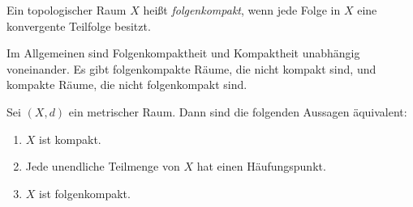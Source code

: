 \begin{definition}
Ein topologischer Raum $X$ heißt \emph{folgenkompakt}, wenn jede Folge in $X$ eine konvergente Teilfolge besitzt.
\end{definition}
Im Allgemeinen sind Folgenkompaktheit und Kompaktheit unabhängig voneinander. Es gibt folgenkompakte Räume, die nicht kompakt sind, und kompakte Räume, die nicht folgenkompakt sind.

\begin{theorem}\label{thm:metric-space-compactness}
Sei $(X,d)$ ein metrischer Raum. Dann sind die folgenden Aussagen äquivalent:
\begin{enumerate}
\item $X$ ist kompakt.
\item Jede unendliche Teilmenge von $X$ hat einen Häufungspunkt.
\item $X$ ist folgenkompakt.
\end{enumerate}
\end{theorem}
